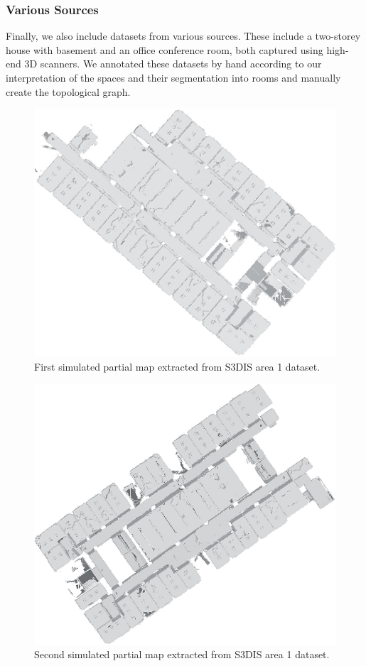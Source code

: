 \subsubsection{Various Sources}
Finally, we also include datasets from various sources. These include a two-storey house with basement and an office conference room, both captured using high-end 3D scanners. We annotated these datasets by hand according to our interpretation of the spaces and their segmentation into rooms and manually create the topological graph. 

\pagebreak
\pagebreak

\begin{figure}[h]
    \centering
    \includegraphics*[width=.6\textwidth]{./fig/area_1_partial_01.png}
    \caption{First simulated partial map extracted from S3DIS area 1 dataset.}
    \label{fig:area_1_partial_01}
\end{figure}

\begin{figure}[h]
    \centering
    \includegraphics*[width=.6\textwidth]{./fig/area_1_partial_02.png}
    \caption{Second simulated partial map extracted from S3DIS area 1 dataset.}
    \label{fig:area_1_partial_02}
\end{figure}

